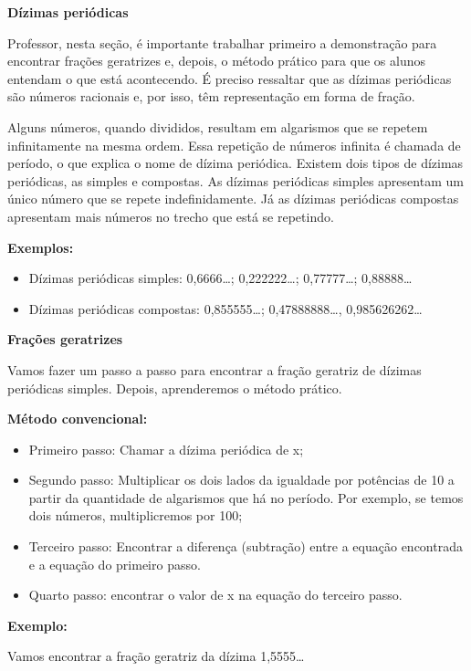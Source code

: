 \textbf{Dízimas periódicas}

Professor, nesta seção, é importante trabalhar primeiro a demonstração
para encontrar frações geratrizes e, depois, o método prático para que
os alunos entendam o que está acontecendo. É preciso ressaltar que as
dízimas periódicas são números racionais e, por isso, têm representação
em forma de fração.

Alguns números, quando divididos, resultam em algarismos que se repetem
infinitamente na mesma ordem. Essa repetição de números infinita é
chamada de período, o que explica o nome de dízima periódica. Existem
dois tipos de dízimas periódicas, as simples e compostas. As dízimas
periódicas simples apresentam um único número que se repete
indefinidamente. Já as dízimas periódicas compostas apresentam mais
números no trecho que está se repetindo.

\textbf{Exemplos:}

\begin{itemize}
\item
  Dízimas periódicas simples: 0,6666\ldots; 0,222222\ldots;
  0,77777\ldots; 0,88888\ldots{}
\item
  Dízimas periódicas compostas: 0,855555\ldots; 0,47888888\ldots,
  0,985626262\ldots{}
\end{itemize}

\textbf{Frações geratrizes}

Vamos fazer um passo a passo para encontrar a fração geratriz de dízimas
periódicas simples. Depois, aprenderemos o método prático.

\textbf{Método convencional:}

\begin{itemize}
\item
  Primeiro passo: Chamar a dízima periódica de x;
\item
  Segundo passo: Multiplicar os dois lados da igualdade por potências de
  10 a partir da quantidade de algarismos que há no período. Por
  exemplo, se temos dois números, multiplicremos por 100;
\item
  Terceiro passo: Encontrar a diferença (subtração) entre a equação
  encontrada e a equação do primeiro passo.
\item
  Quarto passo: encontrar o valor de x na equação do terceiro passo.
\end{itemize}

\textbf{Exemplo:}

Vamos encontrar a fração geratriz da dízima 1,5555\ldots{}

